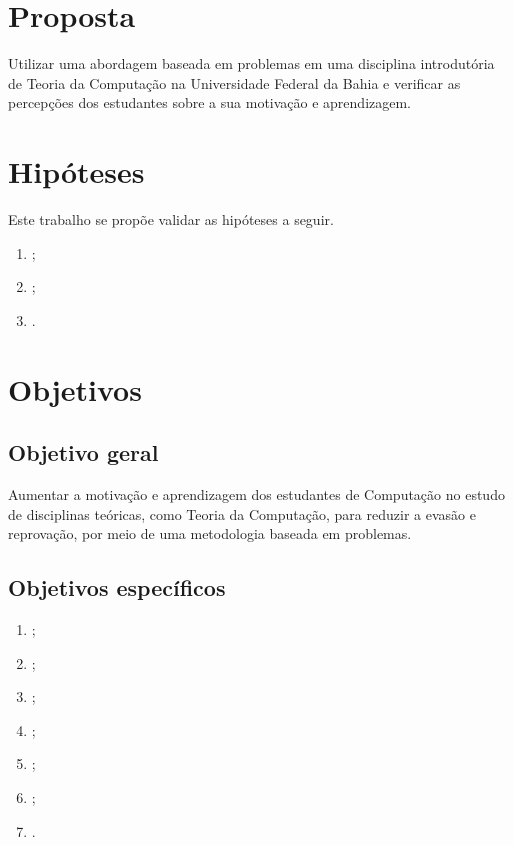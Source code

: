 \section{Proposta}
\label{sec-proposta}
Utilizar uma abordagem baseada em problemas em uma disciplina
introdutória de Teoria da Computação na Universidade Federal
da Bahia e verificar as percepções dos estudantes sobre a sua
motivação e aprendizagem.

\section{Hipóteses}
\label{sec-hipoteses}
Este trabalho se propõe validar as hipóteses a seguir.

\begin{enumerate}
\item{\label{h1ref} \hatexto;}
\item{\label{h2ref} \hbtexto;}
\item{\label{h3ref} \hctexto.}
\end{enumerate}

\section{Objetivos}
\label{sec-objetivos}

\subsection{Objetivo geral}
Aumentar a motivação e aprendizagem dos estudantes de Computação no estudo
de disciplinas teóricas, como Teoria da Computação, para reduzir a evasão e reprovação,
por meio de uma metodologia baseada em problemas.

\subsection{Objetivos específicos}
\begin{enumerate}
\item{\label{oe1ref} \oeatexto;}
\item{\label{oe2ref} \oebtexto;}
\item{\label{oe3ref} \oectexto;}
\item{\label{oe4ref} \oedtexto;}
\item{\label{oe5ref} \oeetexto;}
\item{\label{oe6ref} \oeftexto;}
\item{\label{oe7ref} \oegtexto.}
\end{enumerate}

